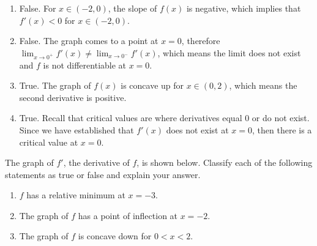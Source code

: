 \begin{Answer}[ref = shape1]
\begin{enumerate}
\item False. For $x \in (-2, 0)$, the slope of $f(x)$ is negative, which 
implies that $f'(x) < 0$ for $x \in (-2, 0)$.
\item False. The graph comes to a point at $x = 0$, therefore $\lim_{x \to 
0^+} f'(x) \neq \lim_{x \to 0^-} f'(x)$, which means the limit does not 
exist and $f$ is not differentiable at $x = 0$.
\item True. The graph of $f(x)$ is concave up for $x \in (0, 2)$, which means 
the second derivative is positive. 
\item True. Recall that critical values are where derivatives equal 0 or do 
not exist. Since we have established that $f'(x)$ does not exist at $x = 0$, 
then there is a critical value at $x = 0$. 
\end{enumerate}
\end{Answer}

\begin{Exercise} The graph of $f'$, 
the derivative of $f$, is shown below. Classify each of the following 
statements as true or false and explain your answer. 

\begin{enumerate}
\item $f$ has a relative minimum at $x = -3$.
\item The graph of $f$ has a point of inflection at $x = -2$.
\item The graph of $f$ is concave down for $0 < x < 2$.
\end{enumerate}

\end{Exercise}

